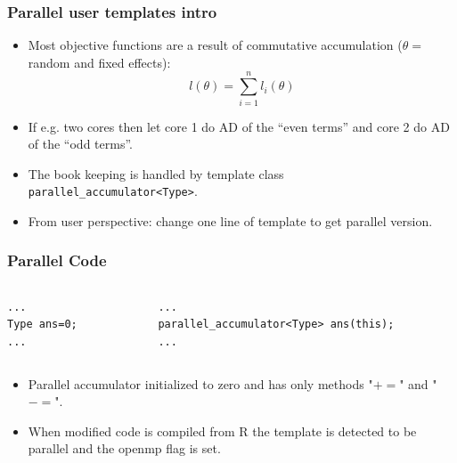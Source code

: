 \documentclass[compress]{beamer}
\begin{document}
\begin{frame}
  \frametitle{Parallel user templates intro}
  \begin{itemize}
  \item Most objective functions are a result of commutative
    accumulation ($\theta=$ random and fixed effects):
    \[l(\theta) = \sum_{i=1}^n l_i(\theta)\]
  \item If e.g. two cores then let core 1 do AD of the ``even terms'' and
    core 2 do AD of the ``odd terms''.
  \item The book keeping is handled by template class
    \texttt{parallel\_accumulator<Type>}.
  \item From user perspective: change one line of template to get
    parallel version.
  \end{itemize}
\end{frame}

\begin{frame}[fragile]
  \frametitle{Parallel Code}
\begin{columns}
    \begin{column}{0.5\textwidth}
\tiny{
\begin{verbatim}
...
Type ans=0;
...
\end{verbatim}
}
    \end{column}
\hspace{-50pt}
\vrule{}
    \begin{column}{0.5\textwidth} 
   \tiny{
    \begin{verbatim}
...
parallel_accumulator<Type> ans(this);
...
    \end{verbatim}
}
\end{column}
\end{columns}
\begin{itemize}
\item Parallel accumulator initialized to zero and has only methods
  "$+=$" and "$-=$".
\item When modified code is compiled from R the template is detected
  to be parallel and the openmp flag is set.
\end{itemize}
\end{frame}
\end{document}

